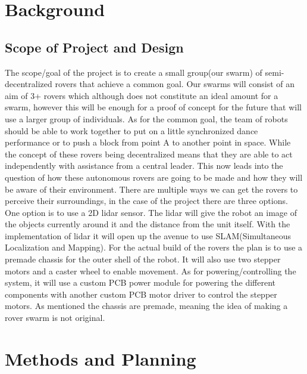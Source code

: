 \documentclass[conference]{IEEEtran}
\begin{document}
\section{Background}


\subsection{Scope of Project and Design}The scope/goal of the project is to create a small group(our swarm) of semi-decentralized rovers that achieve a common goal. Our swarms will consist of an aim of 3+ rovers which although does not constitute an ideal amount for a swarm, however this will be enough for a proof of concept for the future that will use a larger group of individuals. As for the common goal, the team of robots should be able to work together to put on a little synchronized dance performance or to push a block from point A to another point in space. While the concept of these rovers being decentralized means that they are able to act independently with assistance from a central leader. This now leads into the question of how these autonomous rovers are going to be made and how they will be aware of their environment.
There are multiple ways we can get the rovers to perceive their surroundings, in the case of the project there are three options. One option is to use a 2D lidar sensor. The lidar will give the robot an image of the objects currently around it and the distance from the unit itself. With the implementation of lidar it will open up the avenue to use SLAM(Simultaneous Localization and Mapping). For the actual build of the rovers the plan is to use a premade chassis for the outer shell of the robot. It will also use two stepper motors and a caster wheel to enable movement. As for powering/controlling the system, it will use a custom PCB power module for powering the different components with another custom PCB motor driver to control the stepper motors. As mentioned the chassis are premade, meaning the idea of making a rover swarm is not original.

\section{Methods and Planning}
\end{document}
